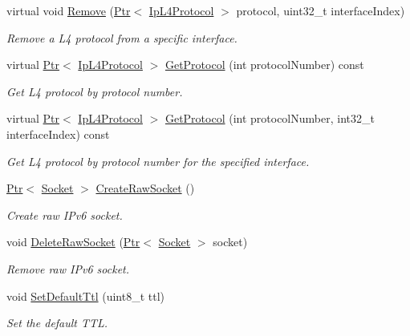 \begin{DoxyCompactItemize}
virtual void \hyperlink{classns3_1_1Ipv6L3Protocol_a2119b6e87a951156aec7a93199bf2b19}{Remove} (\hyperlink{classns3_1_1Ptr}{Ptr}$<$ \hyperlink{classns3_1_1IpL4Protocol}{Ip\+L4\+Protocol} $>$ protocol, uint32\+\_\+t interface\+Index)
\begin{DoxyCompactList}\small\item\em Remove a L4 protocol from a specific interface. \end{DoxyCompactList}\item 
virtual \hyperlink{classns3_1_1Ptr}{Ptr}$<$ \hyperlink{classns3_1_1IpL4Protocol}{Ip\+L4\+Protocol} $>$ \hyperlink{classns3_1_1Ipv6L3Protocol_acb189bb5deceb95e78f2a443609c8d64}{Get\+Protocol} (int protocol\+Number) const 
\begin{DoxyCompactList}\small\item\em Get L4 protocol by protocol number. \end{DoxyCompactList}\item 
virtual \hyperlink{classns3_1_1Ptr}{Ptr}$<$ \hyperlink{classns3_1_1IpL4Protocol}{Ip\+L4\+Protocol} $>$ \hyperlink{classns3_1_1Ipv6L3Protocol_a8c7d6e8831a6606311f0dd0eab0a3f56}{Get\+Protocol} (int protocol\+Number, int32\+\_\+t interface\+Index) const 
\begin{DoxyCompactList}\small\item\em Get L4 protocol by protocol number for the specified interface. \end{DoxyCompactList}\item 
\hyperlink{classns3_1_1Ptr}{Ptr}$<$ \hyperlink{classns3_1_1Socket}{Socket} $>$ \hyperlink{classns3_1_1Ipv6L3Protocol_a6aa13fd7fb8a9afa3c017ff15799fd23}{Create\+Raw\+Socket} ()
\begin{DoxyCompactList}\small\item\em Create raw I\+Pv6 socket. \end{DoxyCompactList}\item 
void \hyperlink{classns3_1_1Ipv6L3Protocol_ab490d143f904a9899e3dd21ac8942016}{Delete\+Raw\+Socket} (\hyperlink{classns3_1_1Ptr}{Ptr}$<$ \hyperlink{classns3_1_1Socket}{Socket} $>$ socket)
\begin{DoxyCompactList}\small\item\em Remove raw I\+Pv6 socket. \end{DoxyCompactList}\item 
void \hyperlink{classns3_1_1Ipv6L3Protocol_a7eadd617007c0f0515d4d6b1c393f45e}{Set\+Default\+Ttl} (uint8\+\_\+t ttl)
\begin{DoxyCompactList}\small\item\em Set the default T\+TL. \end{DoxyCompactList}\item 

\end{DoxyCompactItemize}
